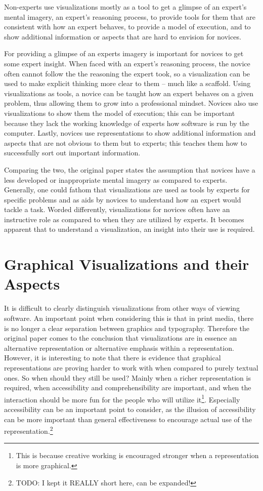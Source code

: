 \documentclass[11pt, a4paper, ngerman, twoside]{article}
\theoremstyle{plain}\newtheorem{Lemma}{Lemma}
\theoremstyle{plain}\newtheorem{Satz}[Lemma]{Satz}
\theoremstyle{definition}\newtheorem{Definition}[Lemma]{Definition}
\theoremstyle{definition}\newtheorem*{Beispiel}{Beispiel}
\theoremstyle{remark}\newtheorem*{Bemerkung}{Bemerkung}
\begin{document}
Non-experts use visualizations mostly as a tool to get a glimpse of an expert's mental imagery, an expert's reasoning process, to provide tools for them that are consistent with how an expert behaves, to provide a model of execution, and to show additional information or aspects that are hard to envision for novices.

For providing a glimpse of an experts imagery is important for novices to get some expert insight. When faced with an expert's reasoning process, the novice often cannot follow the the reasoning the expert took, so a visualization can be used to make explicit thinking more clear to them – much like a scaffold. Using visualizations as tools, a novice can be taught how an expert behaves on a given problem, thus allowing them to grow into a professional mindset. Novices also use visualizations to show them the model of execution; this can be important because they lack the working knowledge of experts how software is run by the computer. Lastly, novices use representations to show additional information and aspects that are not obvious to them but to experts; this teaches them how to successfully sort out important information.

Comparing the two, the original paper states the assumption that novices have a less developed or inappropriate mental imagery as compared to experts. Generally, one could fathom that visualizations are used as tools by experts for specific problems and as aids by novices to understand how an expert would tackle a task. Worded differently, visualizations for novices often have an instructive role as compared to when they are utilized by experts. It becomes apparent that to understand a visualization, an insight into their use is required.

\section{Graphical Visualizations and their Aspects}

It is difficult to clearly distinguish visualizations from other ways of viewing software. An important point when considering this is that in print media, there is no longer a clear separation between graphics and typography. Therefore the original paper comes to the conclusion that visualizations are in essence an alternative representation or alternative emphasis within a representation. However, it is interesting to note that there is evidence that graphical representations are proving harder to work with when compared to purely textual ones. So when should they still be used? Mainly when a richer representation is required, when accessibility and comprehensibility are important, and when the interaction should be more fun for the people who will utilize it\footnote{This is because creative working is encouraged stronger when a representation is more graphical.}. Especially accessibility can be an important point to consider, as the illusion of accessibility can be more important than general effectiveness to encourage actual use of the representation.\footnote{TODO: I kept it REALLY short here, can be expanded!}
\end{document}
